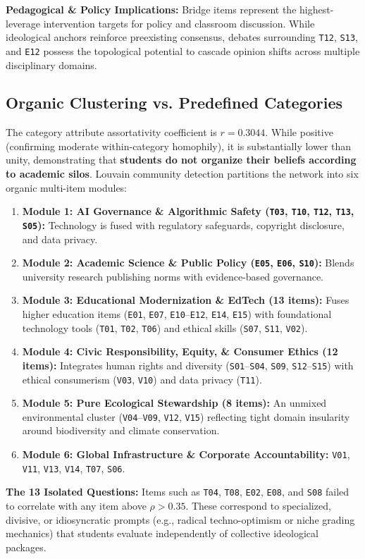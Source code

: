 \documentclass[10pt, a4paper]{article}
\begin{document}
\textbf{Pedagogical \& Policy Implications:} Bridge items represent the highest-leverage intervention targets for policy and classroom discussion. While ideological anchors reinforce preexisting consensus, debates surrounding \texttt{T12}, \texttt{S13}, and \texttt{E12} possess the topological potential to cascade opinion shifts across multiple disciplinary domains.

\subsection{Organic Clustering vs. Predefined Categories}
The category attribute assortativity coefficient is $r = 0.3044$. While positive (confirming moderate within-category homophily), it is substantially lower than unity, demonstrating that \textbf{students do not organize their beliefs according to academic silos}. Louvain community detection partitions the network into six organic multi-item modules:
\begin{enumerate}
    \setlength{\itemsep}{0pt}
    \item \textbf{Module 1: AI Governance \& Algorithmic Safety (\texttt{T03}, \texttt{T10}, \texttt{T12}, \texttt{T13}, \texttt{S05}):} Technology is fused with regulatory safeguards, copyright disclosure, and data privacy.
    \item \textbf{Module 2: Academic Science \& Public Policy (\texttt{E05}, \texttt{E06}, \texttt{S10}):} Blends university research publishing norms with evidence-based governance.
    \item \textbf{Module 3: Educational Modernization \& EdTech (13 items):} Fuses higher education items (\texttt{E01}, \texttt{E07}, \texttt{E10}--\texttt{E12}, \texttt{E14}, \texttt{E15}) with foundational technology tools (\texttt{T01}, \texttt{T02}, \texttt{T06}) and ethical skills (\texttt{S07}, \texttt{S11}, \texttt{V02}).
    \item \textbf{Module 4: Civic Responsibility, Equity, \& Consumer Ethics (12 items):} Integrates human rights and diversity (\texttt{S01}--\texttt{S04}, \texttt{S09}, \texttt{S12}--\texttt{S15}) with ethical consumerism (\texttt{V03}, \texttt{V10}) and data privacy (\texttt{T11}).
    \item \textbf{Module 5: Pure Ecological Stewardship (8 items):} An unmixed environmental cluster (\texttt{V04}--\texttt{V09}, \texttt{V12}, \texttt{V15}) reflecting tight domain insularity around biodiversity and climate conservation.
    \item \textbf{Module 6: Global Infrastructure \& Corporate Accountability:} \texttt{V01}, \texttt{V11}, \texttt{V13}, \texttt{V14}, \texttt{T07}, \texttt{S06}.
\end{enumerate}
\textbf{The 13 Isolated Questions:} Items such as \texttt{T04}, \texttt{T08}, \texttt{E02}, \texttt{E08}, and \texttt{S08} failed to correlate with any item above $\rho > 0.35$. These correspond to specialized, divisive, or idiosyncratic prompts (e.g., radical techno-optimism or niche grading mechanics) that students evaluate independently of collective ideological packages.
\end{document}
